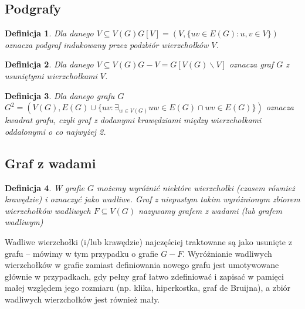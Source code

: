 \documentclass{pracamgr}
\newtheorem{defi}{Definicja}[section] %
\begin{document}
   \subsection{Podgrafy}
    \begin{defi}\label{podgraf indukowany}
     Dla danego $V\subseteq V(G)$\quad $G[V]=(V,\{uv\in E(G):u,v\in V\})$ oznacza \emph{podgraf indukowany} przez podzbiór wierzchołków $V$.
    \end{defi}
    \begin{defi}\label{roznica grafow}
     Dla danego $V\subseteq V(G)$\quad $G-V=G[V(G)\backslash V]$ oznacza \emph{graf $G$ z usuniętymi wierzchołkami $V$}.
    \end{defi}
    \begin{defi}\label{kwadrat grafu}
     Dla danego grafu $G$\newline $G^2=(V(G),E(G)\cup\{uv:\exists_{w\in V(G)}uw\in E(G)\cap wv\in E(G)\})$
     oznacza \emph{kwadrat grafu}, czyli graf z dodanymi krawędziami między wierzchołkami oddalonymi o co najwyżej 2.
    \end{defi}
   \subsection{Graf z wadami}
    \begin{defi}\label{graf z wadami}
     W grafie $G$ możemy wyróżnić niektóre wierzchołki (czasem również krawędzie) i oznaczyć jako wadliwe.
     Graf z niepustym takim wyróżnionym zbiorem wierzchołków wadliwych $F\subseteq V(G)$ nazywamy \emph{grafem z wadami} (lub \emph{grafem wadliwym})
    \end{defi}%
    Wadliwe wierzchołki (i/lub krawędzie) najczęściej traktowane są jako usunięte z grafu -- mówimy w tym przypadku o grafie $G-F$.
    Wyróżnianie wadliwych wierzchołków w grafie zamiast definiowania nowego grafu jest umotywowane głównie w przypadkach,
    gdy pełny graf łatwo zdefiniować i zapisać w pamięci małej względem jego rozmiaru (np. klika, hiperkostka, graf de Bruijna),
    a zbiór wadliwych wierzchołków jest również mały.
\end{document}
